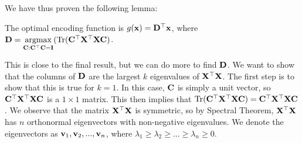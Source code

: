 We have thus proven the following lemma:
\begin{lemma}
    The optimal encoding function is $g(\vx) = \MD^\top\vx$, where $\MD = \underset{\MC : \MC^\top\MC = \MI}{\argmax} (\trace(\MC^\top\MX^\top\MX\MC)$.
\end{lemma}
This is close to the final result, but we can do more to find $\MD$.  We want to show that the columns of $\MD$ are the largest $k$ eigenvalues of $\MX^\top\MX$.  The first step is to show that this is true for $k = 1$.  In this case, $\MC$ is simply a unit vector, so $\MC^\top\MX^\top\MX\MC$ is a $1 \times 1$ matrix.  This then implies that $\trace(\MC^\top\MX^\top\MX\MC) = \MC^\top\MX^\top\MX\MC$.  We observe that the matrix $\MX^\top\MX$ is symmetric, so by Spectral Theorem, $\MX^\top\MX$ has $n$ orthonormal eigenvectors with non-negative eigenvalues.  We denote the eigenvectors as $\vv_1, \vv_2, ..., \vv_n$, where $\lambda_1 \geq \lambda_2 \geq ... \geq \lambda_n \geq 0$.

